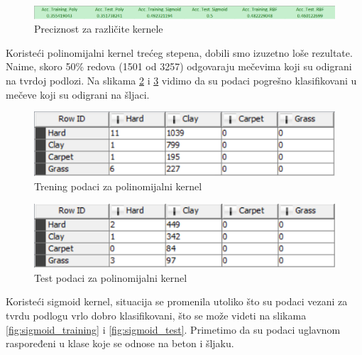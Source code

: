 \documentclass[a4paper]{article}
\begin{document}
\begin{figure}[h!]
	\begin{center}
		\includegraphics[scale=0.42]{KNIME_project/SVM/preciznost}
	\end{center}
	\caption{Preciznost za različite kernele}
	\label{fig:precision}
\end{figure}


Koristeći polinomijalni kernel trećeg stepena, dobili smo izuzetno loše rezultate.
Naime, skoro 50\% redova (1501 od 3257) odgovaraju mečevima koji su odigrani na tvrdoj podlozi.
Na slikama \ref{fig:poly_training} i \ref{fig:poly_test} vidimo da su podaci pogrešno klasifikovani u
mečeve koji su odigrani na šljaci.

\begin{figure}[h!]
	\begin{center}
		\includegraphics[scale=0.6]{KNIME_project/SVM/poly_training}
	\end{center}
	\caption{Trening podaci za polinomijalni kernel}
	\label{fig:poly_training}
\end{figure}

\begin{figure}[h!]
	\begin{center}
		\includegraphics[scale=0.6]{KNIME_project/SVM/poly_test}
	\end{center}
	\caption{Test podaci za polinomijalni kernel}
	\label{fig:poly_test}
\end{figure}


Koristeći sigmoid kernel, situacija se promenila utoliko što su podaci vezani za tvrdu podlogu
vrlo dobro klasifikovani, što se može videti na slikama \ref{fig:sigmoid_training} i \ref{fig:sigmoid_test}.
Primetimo da su podaci uglavnom raspoređeni u klase koje se odnose na beton i šljaku.
\end{document}
